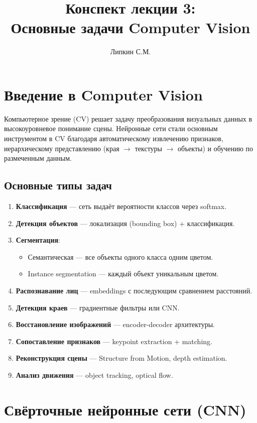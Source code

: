 \documentclass[a4paper,12pt]{article}
\title{Конспект лекции 3: \\ Основные задачи Computer Vision}
\author{Липкин С.М.}
\date{}
\begin{document}
\maketitle

\section{Введение в Computer Vision}

Компьютерное зрение (CV) решает задачу преобразования визуальных данных в высокоуровневое понимание сцены. Нейронные сети стали основным инструментом в CV благодаря автоматическому извлечению признаков, иерархическому представлению (края $\to$ текстуры $\to$ объекты) и обучению по размеченным данным.

\subsection{Основные типы задач}

\begin{enumerate}
    \item \textbf{Классификация} — сеть выдаёт вероятности классов через softmax.
    \item \textbf{Детекция объектов} — локализация (bounding box) + классификация.
    \item \textbf{Сегментация}:
    \begin{itemize}
        \item Семантическая — все объекты одного класса одним цветом.
        \item Instance segmentation — каждый объект уникальным цветом.
    \end{itemize}
    \item \textbf{Распознавание лиц} — embeddings с последующим сравнением расстояний.
    \item \textbf{Детекция краев} — градиентные фильтры или CNN.
    \item \textbf{Восстановление изображений} — encoder-decoder архитектуры.
    \item \textbf{Сопоставление признаков} — keypoint extraction + matching.
    \item \textbf{Реконструкция сцены} — Structure from Motion, depth estimation.
    \item \textbf{Анализ движения} — object tracking, optical flow.
\end{enumerate}

\section{Свёрточные нейронные сети (CNN)}
\end{document}
